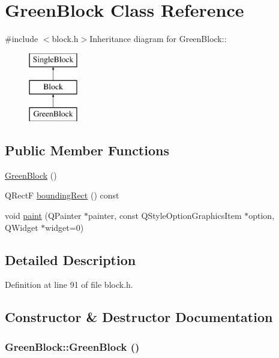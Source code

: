 \hypertarget{class_green_block}{
\section{GreenBlock Class Reference}
\label{class_green_block}
}


{\ttfamily \#include $<$block.h$>$}Inheritance diagram for GreenBlock::\begin{figure}[H]
\begin{center}
\leavevmode
\includegraphics[height=3cm]{class_green_block}
\end{center}
\end{figure}
\subsection*{Public Member Functions}
\begin{DoxyCompactItemize}
\item 
\hyperlink{class_green_block_a3a7746d5a33fb897d6a60dc0f16aa519}{GreenBlock} ()
\item 
QRectF \hyperlink{class_green_block_a302d2bfd76e7f40196c699ae52607175}{boundingRect} () const 
\item 
void \hyperlink{class_green_block_a8ca48ce5449a83de5287d13d99bf2df1}{paint} (QPainter $\ast$painter, const QStyleOptionGraphicsItem $\ast$option, QWidget $\ast$widget=0)
\end{DoxyCompactItemize}


\subsection{Detailed Description}


Definition at line 91 of file block.h.

\subsection{Constructor \& Destructor Documentation}
\hypertarget{class_green_block_a3a7746d5a33fb897d6a60dc0f16aa519}{
\subsubsection[{GreenBlock}]{\setlength{\rightskip}{0pt plus 5cm}GreenBlock::GreenBlock ()}}
\label{class_green_block_a3a7746d5a33fb897d6a60dc0f16aa519}


